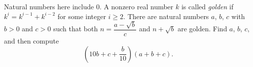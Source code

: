 Natural numbers here include $0$. A nonzero real number $k$ is called \emph{golden} if $k^i=k^{i-1}+k^{i-2}$ for some integer $i\ge2$. There are natural numbers $a$, $b$, $c$ with $b>0$ and $c>0$ such that both $n=\dfrac{a-\sqrt b}{c}$ and $n+\sqrt b$ are golden. Find $a$, $b$, $c$, and then compute
\[
\left(10b+c+\dfrac{b}{10}\right)(a+b+c).
\]
